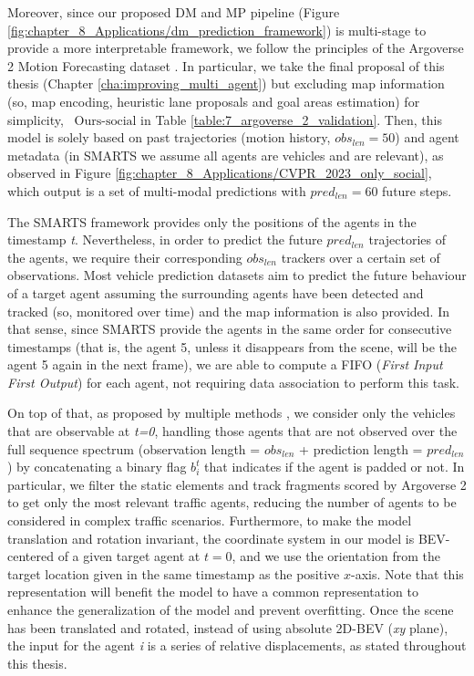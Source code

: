 Moreover, since our proposed \ac{DM} and \ac{MP} pipeline (Figure \ref{fig:chapter_8_Applications/dm_prediction_framework}) is multi-stage to provide a more interpretable framework, we follow the principles of the Argoverse 2 Motion Forecasting dataset \cite{wilson2023argoverse}. In particular, we take the final proposal of this thesis (Chapter \ref{cha:improving_multi_agent}) but excluding map information (so, map encoding, heuristic lane proposals and goal areas estimation) for simplicity, \ie \ $\text{Ours-social}$ in Table \ref{table:7_argoverse_2_validation}. Then, this model is solely based on past trajectories (motion history, $obs_{len} = 50$) and agent metadata (in \ac{SMARTS} we assume all agents are vehicles and are relevant), as observed in Figure \ref{fig:chapter_8_Applications/CVPR_2023_only_social}, which output is a set of multi-modal predictions with $pred_{len} = 60$ future steps.

The \acf{SMARTS} \cite{SMARTS} framework provides only the positions of the agents in the timestamp \textit{t}. Nevertheless, in order to predict the future $pred_{len}$ trajectories of the agents, we require their corresponding $obs_{len}$ trackers over a certain set of observations. Most vehicle prediction datasets \cite{wilson2023argoverse} aim to predict the future behaviour of a target agent assuming the surrounding agents have been detected and tracked (so, monitored over time) and the map information is also provided. In that sense, since \ac{SMARTS} provide the agents in the same order for consecutive timestamps (that is, the agent 5, unless it disappears from the scene, will be the agent 5 again in the next frame), we are able to compute a FIFO (\textit{First Input First Output}) for each agent, not requiring data association \cite{kuhn1955hungarian} to perform this task. 

On top of that, as proposed by multiple methods \cite{liang2020learning, gomez2023improving}, we consider only the vehicles that are observable at \textit{t=0}, handling those agents that are not observed over the full sequence spectrum (observation length = \textit{$obs_{len}$} + prediction length = \textit{$pred_{len}$}) by concatenating a binary flag $b_i^t$ that indicates if the agent is padded or not. In particular, we filter the static elements and track fragments scored by Argoverse 2 to get only the most relevant traffic agents, reducing the number of agents to be considered in complex traffic scenarios. Furthermore, to make the model translation and rotation invariant, the coordinate system in our model is \ac{BEV}-centered of a given target agent at $t = 0$, and we use the orientation from the target location given in the same timestamp as the positive $x$-axis. Note that this representation will benefit the model to have a common representation to enhance the generalization of the model and prevent overfitting. Once the scene has been translated and rotated, instead of using absolute 2D-\ac{BEV} (\textit{xy} plane), the input for the agent \textit{i} is a series of relative displacements, as stated throughout this thesis.

